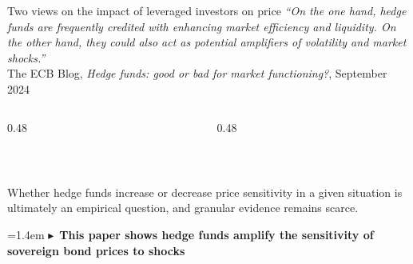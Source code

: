 \documentclass[aspectratio=169,10pt]{beamer}
\def\hird{\textcolor{accentred}}
\def\higr{\textcolor{accentgreen}}
\newcommand{\lvs}{\vspace{0.32cm}}
\newcommand{\svs}{\vspace{0.18cm}}
\newcommand{\takeaway}[1]{%
  \par\smallskip\noindent
  \hangindent=1.4em\hangafter=1
  \textcolor{goetheblue}{$\blacktriangleright$}\ {\color{goetheblue}\bfseries #1}\par}
\begin{document}
\begin{frame}{Two views on the impact of leveraged investors on price}
\lvs
{\itshape ``On the one hand, hedge funds are frequently credited with \higr{enhancing market efficiency} and liquidity. On the other hand, they could also act as potential \hird{amplifiers of volatility and market shocks}.''}\\[3pt]
{\scriptsize\color{softgrey} The ECB Blog, \textit{Hedge funds: good or bad for market functioning?}, September 2024}
\svs
\begin{columns}[t]
\begin{column}{0.48\textwidth}
  \begin{center}
  \\[3pt]
  {\scriptsize\color{softgrey}\citet{gromb2002, cao2018}}
  \end{center}
\end{column}
\begin{column}{0.48\textwidth}
  \begin{center}
  \\[3pt]
  {\scriptsize\color{softgrey}\citet{shleifer1997, brunnermeier2009, geanakoplos2010}}
  \end{center}
\end{column}
\end{columns}
\lvs
Whether hedge funds increase or decrease price sensitivity in a given situation is ultimately an empirical question, and granular evidence remains scarce.
\takeaway{This paper shows hedge funds amplify the sensitivity of sovereign bond prices to shocks}
\end{frame}
\end{document}
